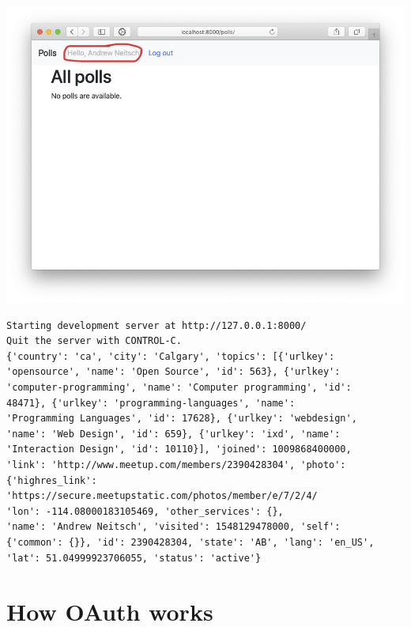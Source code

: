 \documentclass[xcolor=svgnames,17pt]{beamer}
\newcommand*{\sizefont}[1]{%
    \ifcase#1\relax
    \or \tiny
    \or \scriptsize
    \or \footnotesize
    \or \small
    \or \normalsize
    \or \large
    \or \Large
    \or \LARGE
    \or \huge
    \or \Huge
    \fi}
\begin{document}
\begin{frame}[plain]
\includegraphics[width=0.9\paperwidth,center]{flow3.png}
\end{frame}

\begin{frame}[fragile]
\sizefont{2}
\begin{verbatim}
Starting development server at http://127.0.0.1:8000/
Quit the server with CONTROL-C.
{'country': 'ca', 'city': 'Calgary', 'topics': [{'urlkey':
'opensource', 'name': 'Open Source', 'id': 563}, {'urlkey':
'computer-programming', 'name': 'Computer programming', 'id':
48471}, {'urlkey': 'programming-languages', 'name':
'Programming Languages', 'id': 17628}, {'urlkey': 'webdesign',
'name': 'Web Design', 'id': 659}, {'urlkey': 'ixd', 'name':
'Interaction Design', 'id': 10110}], 'joined': 1009868400000,
'link': 'http://www.meetup.com/members/2390428304', 'photo':
{'highres_link': 'https://secure.meetupstatic.com/photos/member/e/7/2/4/
'lon': -114.08000183105469, 'other_services': {},
'name': 'Andrew Neitsch', 'visited': 1548129478000, 'self':
{'common': {}}, 'id': 2390428304, 'state': 'AB', 'lang': 'en_US',
'lat': 51.04999923706055, 'status': 'active'}
\end{verbatim}
\end{frame}

\section{How OAuth works}

\begin{frame}
\tableofcontents[currentsection]
\end{frame}
\end{document}
